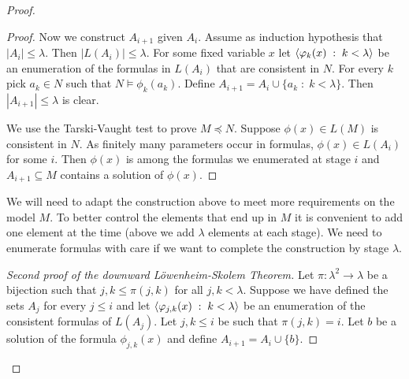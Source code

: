 \begin{proof}
\begin{proof}
Now we construct $A_{i+1}$ given $A_i$.
Assume as induction hypothesis that $|A_i|\le\lambda$.
Then $|L(A_i)|\le\lambda$.
For some fixed variable $x$ let $\langle\varphi_k(x)\;:\;k<\lambda\rangle$ be an enumeration of the formulas in $L(A_i)$ that are consistent in $N$.
For every $k$ pick $a_k\in N$ such that $N\models\phi_k(a_k)$.
 Define $A_{i+1}=A_i\cup\{a_k\;:\;k<\lambda\}$.
Then $|A_{i+1}|\le\lambda$ is clear.

We use the Tarski-Vaught test to prove $M\preceq N$.
Suppose $\phi(x)\in L(M)$ is consistent in $N$.
As finitely many parameters occur in formulas, $\phi(x)\in L(A_i)$ for some $i$.
Then $\phi(x)$ is among the formulas we enumerated at stage $i$ and $A_{i+1}\subseteq M$ contains a solution of $\phi(x)$.
\end{proof}

We will need to adapt the construction above to meet more requirements on the model $M$.
To better control the elements that end up in $M$ it is convenient to add one element at the time (above we add $\lambda$ elements at each stage).
We need to enumerate formulas with care if we want to complete the construction by stage $\lambda$.

% 

\begin{proof}[Second proof of the downward L\"owenheim-Skolem Theorem]
  Let $\pi:\lambda^2\to\lambda$ be a bijection such that $j,k\le\pi(j,k)$ for all $j,k<\lambda$.
  Suppose we have defined the sets $A_j$ for every $j\le i$ and let $\langle\varphi_{j,k}(x)\;:\;k<\lambda\rangle$ be an enumeration of the consistent formulas of $L(A_j)$.
  Let $j,k\le i$ be such that $\pi(j,k)=i$.
  Let $b$ be a solution of the formula $\phi_{j,k}(x)$ and define $A_{i+1}=A_i\cup\{b\}$.


\end{proof}
\end{proof}

